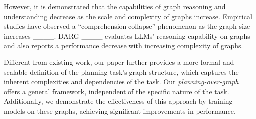 


However, it is demonstrated that the capabilities of graph reasoning and understanding decrease as the scale and complexity of graphs increase. 
Empirical studies have observed a ``comprehension collapse'' phenomenon as the graph size increases ____.
DARG ____ evaluates LLMs' reasoning capability on graphs and also reports a performance decrease with increasing complexity of graphs. 


Different from existing work, our paper further provides a more formal and scalable definition of the planning task's graph structure, which captures the inherent complexities and dependencies of the task. Our \textit{planning-over-graph} offers a general framework, independent of the specific nature of the task. Additionally, we demonstrate the effectiveness of this approach by training models on these graphs, achieving significant improvements in performance.